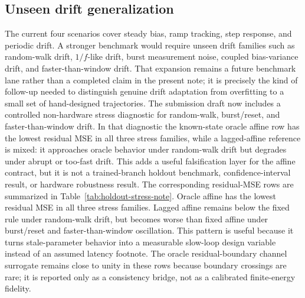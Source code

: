 \documentclass[11pt]{article}
\begin{document}
\subsection{Unseen drift generalization}

The current four scenarios cover steady bias, ramp tracking, step response, and
periodic drift.  A stronger benchmark would require unseen drift families such
as random-walk drift, \(1/f\)-like drift, burst measurement noise, coupled
bias-variance drift, and faster-than-window drift.  That expansion remains a
future benchmark lane rather than a completed claim in the present note; it is
precisely the kind of follow-up needed to distinguish genuine drift adaptation
from overfitting to a small set of hand-designed trajectories.
The submission draft now includes a controlled non-hardware stress diagnostic
for random-walk, burst/reset, and faster-than-window drift.  In that diagnostic
the known-state oracle affine row has the lowest residual MSE in all three
stress families, while a lagged-affine reference is mixed: it approaches oracle
behavior under random-walk drift but degrades under abrupt or too-fast drift.
This adds a useful falsification layer for the affine contract, but it is not a
trained-branch holdout benchmark, confidence-interval result, or hardware
robustness result.
The corresponding residual-MSE rows are summarized in
Table~\ref{tab:holdout-stress-note}.  Oracle affine has the lowest residual
MSE in all three stress families.  Lagged affine remains below the fixed rule
under random-walk drift, but becomes worse than fixed affine under burst/reset
and faster-than-window oscillation.  This pattern is useful because it turns
stale-parameter behavior into a measurable slow-loop design variable instead
of an assumed latency footnote.  The oracle residual-boundary channel
surrogate remains close to unity in these rows because boundary crossings are
rare; it is reported only as a consistency bridge, not as a calibrated
finite-energy fidelity.
\end{document}
